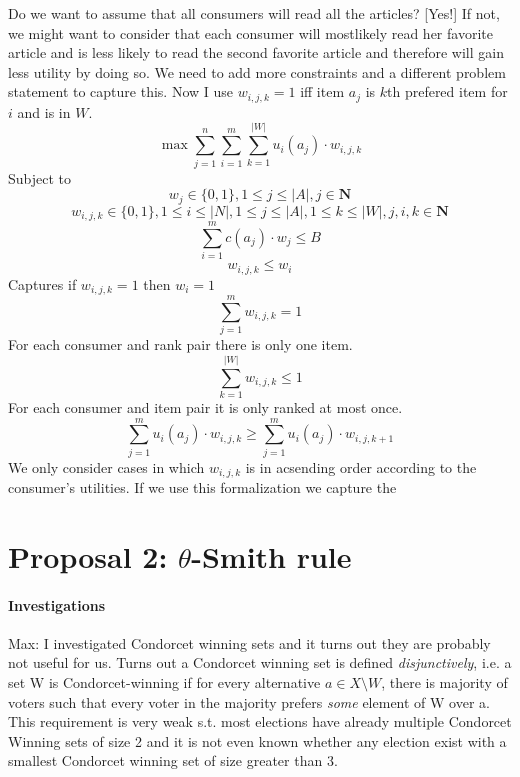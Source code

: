 \documentclass[10pt,a4paper]{article}
\begin{document}
Do we want to assume that all consumers will read all the articles? [Yes!] If not, we might want to consider that each consumer will mostlikely read her favorite article and is less likely to read the second favorite article and therefore will gain less utility by doing so. We need to add more constraints and a different problem statement to capture this. Now I use $w_{i,j,k} = 1$ iff item $a_j$ is $k$th prefered item for $i$ and is in $W$.
\begin{equation}
\max \sum_{j=1}^n \sum_{i=1}^m \sum_{k=1}^{|W|}u_i(a_j)\cdot w_{i,j,k}
\end{equation}
Subject to
\begin{equation}
w_j \in \{0,1\}, 1 \leq j \leq |A|, j \in \mathbf{N}
\end{equation}
\begin{equation}
w_{i,j,k} \in \{0,1\}, 1 \leq i \leq |N|, 1 \leq j \leq |A|, 1 \leq k \leq |W|, j,i,k \in \mathbf{N} 
\end{equation}
\begin{equation}
\sum_{i=1}^m c(a_j)\cdot w_j \leq B 
\end{equation}
\begin{equation}
w_{i,j,k} \leq w_i
\end{equation}
Captures if $w_{i,j,k}=1$ then $w_i=1$
\begin{equation}
\sum_{j=1}^{m} w_{i,j,k}=1
\end{equation}
For each consumer and rank pair there is only one item.
\begin{equation}
\sum_{k=1}^{|W|} w_{i,j,k}\leq 1
\end{equation}
For each consumer and item pair it is only ranked at most once.
\begin{equation}
\sum_{j=1}^{m} u_i(a_j)\cdot w_{i,j,k} \geq \sum_{j=1}^{m} u_i(a_j)\cdot w_{i,j,k+1}
\end{equation}
We only consider cases in which $w_{i,j,k}$ is in acsending order according to the consumer's utilities. If we use this formalization we capture the

\section{Proposal 2: $\theta$-Smith rule}

\paragraph{Investigations}

Max: I investigated Condorcet winning sets and it turns out they are probably not useful for us. Turns out a Condorcet winning set is defined
\emph{disjunctively}, i.e. a set W is Condorcet-winning if for every alternative $a\in X\setminus W$, there is majority of voters such that every
voter in the majority prefers \emph {some} element of W over a. This requirement is very weak s.t. most elections have already multiple Condorcet
Winning sets of size 2 and it is not even known whether any election exist with a smallest Condorcet winning set of size greater than 3.
\end{document}
